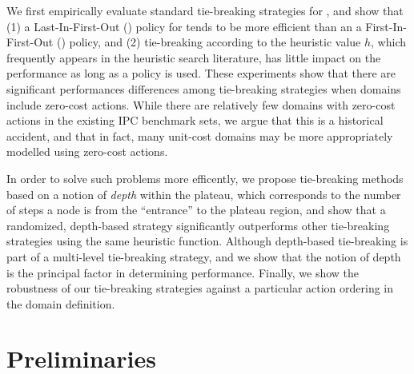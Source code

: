 We first empirically evaluate standard tie-breaking strategies for \astar, and show that 
% 
(1) a Last-In-First-Out (\lifo) policy for tends to be more efficient than an a First-In-First-Out (\fifo) policy, and 
% 
(2) tie-breaking according to the heuristic value $h$, which
frequently appears in the heuristic search literature, has little 
impact on the performance as long as a \lifo policy is used.
% 
These experiments show that there are significant performances differences among tie-breaking strategies
when domains include zero-cost actions.  While there are relatively few domains with zero-cost actions in the existing IPC benchmark sets, we argue that this is a historical accident, and that in fact, many unit-cost domains may be more appropriately modelled using zero-cost actions.

In order to solve such problems more efficently,
we propose 
tie-breaking methods
based on a notion of \emph{depth} within the plateau, which corresponds to the number of steps 
a node is from the ``entrance'' to the plateau region, and show that a randomized, depth-based strategy
significantly outperforms 
other tie-breaking strategies using the same heuristic function.
Although depth-based tie-breaking is part of a multi-level tie-breaking strategy,
and we show that the notion of depth is the principal factor in determining performance.
Finally, we show the robustness of our tie-breaking strategies
against a particular action ordering in the domain definition.





\section{Preliminaries}

